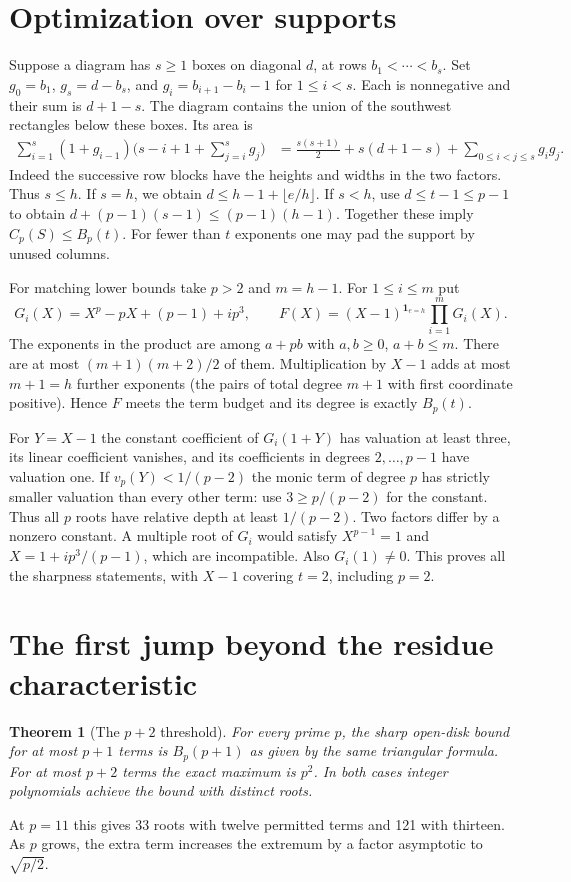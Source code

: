 \documentclass[11pt]{article}
\newtheorem{theorem}{Theorem}
\newcommand{\ord}{v_p}
\begin{document}
\section{Optimization over supports}
Suppose a diagram has $s\ge1$ boxes on diagonal $d$, at rows $b_1<\cdots<b_s$. Set $g_0=b_1$, $g_s=d-b_s$, and $g_i=b_{i+1}-b_i-1$ for $1\le i<s$. Each is nonnegative and their sum is $d+1-s$. The diagram contains the union of the southwest rectangles below these boxes. Its area is
\[
 \begin{aligned}
 \sum_{i=1}^{s}(1+g_{i-1})\Big(s-i+1+\sum_{j=i}^{s}g_j\Big)
 &=\frac{s(s+1)}2+s(d+1-s)+\sum_{0\le i<j\le s}g_i g_j .
 \end{aligned}
\]
Indeed the successive row blocks have the heights and widths in the two factors. Thus $s\le h$. If $s=h$, we obtain $d\le h-1+\lfloor e/h\rfloor$. If $s<h$, use $d\le t-1\le p-1$ to obtain $d+(p-1)(s-1)\le(p-1)(h-1)$. Together these imply $C_p(S)\le B_p(t)$. For fewer than $t$ exponents one may pad the support by unused columns.

For matching lower bounds take $p>2$ and $m=h-1$. For $1\le i\le m$ put
\[
 G_i(X)=X^p-pX+(p-1)+i p^3,\qquad
 F(X)=(X-1)^{\mathbf1_{e=h}}\prod_{i=1}^m G_i(X).
\]
The exponents in the product are among $a+pb$ with $a,b\ge0$, $a+b\le m$. There are at most $(m+1)(m+2)/2$ of them. Multiplication by $X-1$ adds at most $m+1=h$ further exponents (the pairs of total degree $m+1$ with first coordinate positive). Hence $F$ meets the term budget and its degree is exactly $B_p(t)$.

For $Y=X-1$ the constant coefficient of $G_i(1+Y)$ has valuation at least three, its linear coefficient vanishes, and its coefficients in degrees $2,\ldots,p-1$ have valuation one. If $\ord(Y)<1/(p-2)$ the monic term of degree $p$ has strictly smaller valuation than every other term: use $3\ge p/(p-2)$ for the constant. Thus all $p$ roots have relative depth at least $1/(p-2)$. Two factors differ by a nonzero constant. A multiple root of $G_i$ would satisfy $X^{p-1}=1$ and $X=1+i p^3/(p-1)$, which are incompatible. Also $G_i(1)\ne0$. This proves all the sharpness statements, with $X-1$ covering $t=2$, including $p=2$.

\section{The first jump beyond the residue characteristic}
\begin{theorem}[The $p+2$ threshold]\label{thm:jump}
For every prime $p$, the sharp open-disk bound for at most $p+1$ terms is $B_p(p+1)$ as given by the same triangular formula. For at most $p+2$ terms the exact maximum is $p^2$. In both cases integer polynomials achieve the bound with distinct roots.
\end{theorem}
At $p=11$ this gives 33 roots with twelve permitted terms and 121 with thirteen. As $p$ grows, the extra term increases the extremum by a factor asymptotic to $\sqrt{p/2}$.
\end{document}
